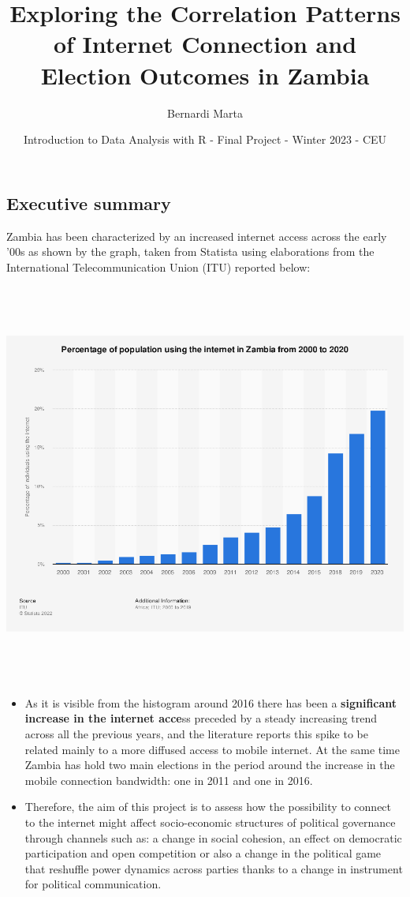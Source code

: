 \documentclass[
]{article}
\title{Exploring the Correlation Patterns of Internet Connection and
Election Outcomes in Zambia}
\author{Bernardi Marta}
\date{Introduction to Data Analysis with R - Final Project - Winter 2023
- CEU}
\begin{document}
\maketitle

\hypertarget{executive-summary}{%
\subsection{Executive summary}\label{executive-summary}}

Zambia has been characterized by an increased internet access across the
early '00s as shown by the graph, taken from Statista using elaborations
from the International Telecommunication Union (ITU) reported below:

\includegraphics[width=6.25in,height=5.20833in]{Zambia_internet_penetration.png}

\begin{itemize}
\item
  As it is visible from the histogram around 2016 there has been a
  \textbf{significant increase in the internet acce}ss preceded by a
  steady increasing trend across all the previous years, and the
  literature reports this spike to be related mainly to a more diffused
  access to mobile internet. At the same time Zambia has hold two main
  elections in the period around the increase in the mobile connection
  bandwidth: one in 2011 and one in 2016.
\item
  Therefore, the aim of this project is to assess how the possibility to
  connect to the internet might affect socio-economic structures of
  political governance through channels such as: a change in social
  cohesion, an effect on democratic participation and open competition
  or also a change in the political game that reshuffle power dynamics
  across parties thanks to a change in instrument for political
  communication.
\end{itemize}
\end{document}
